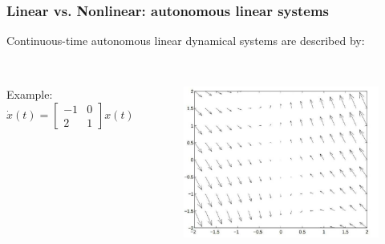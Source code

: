 \documentclass{beamer}
\begin{document}
\begin{frame}
\frametitle{Linear vs. Nonlinear: autonomous linear systems}
\vspace{-2ex}
Continuous-time autonomous linear dynamical systems are described by:\\
\smallskip
{}\\
\begin{columns}
Example: $\dot{x}(t) = \begin{bmatrix} -1 & 0 \\ 2 & 1 \end{bmatrix} x(t)$

\begin{figure}
\includegraphics[width=1\linewidth]{autonomous}
\end{figure}
\end{columns}
\end{frame}

\end{document}
